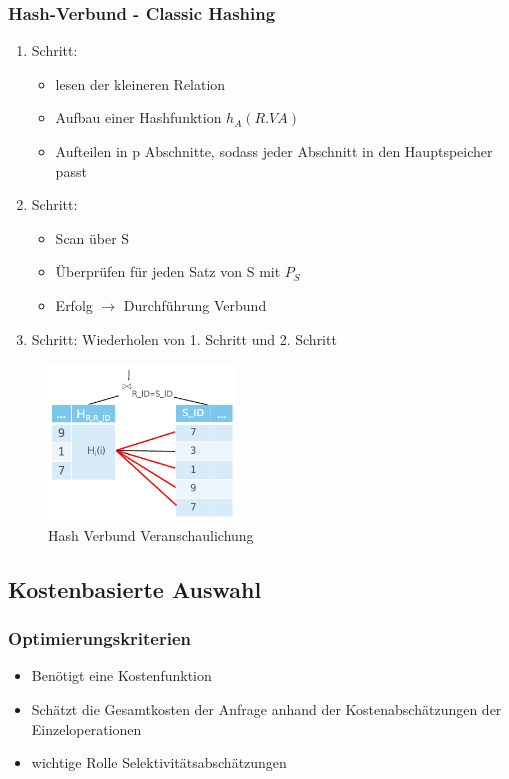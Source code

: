 \documentclass[a4paper]{article}
\begin{document}
    \subsubsection{Hash-Verbund - Classic Hashing}
    \begin{enumerate}
        \item Schritt:
        \begin{itemize}
            \item lesen der kleineren Relation
            \item Aufbau einer Hashfunktion $h_A(R.VA)$
            \item Aufteilen in p Abschnitte, sodass jeder Abschnitt in den Hauptspeicher passt
        \end{itemize}
        
        \item Schritt:
        \begin{itemize}
            \item Scan über S
            \item Überprüfen für jeden Satz von S mit $P_S$
            \item Erfolg $\to$ Durchführung Verbund
        \end{itemize}
        \item Schritt: Wiederholen von 1. Schritt und 2. Schritt
    \end{enumerate}
    \begin{figure}[htp]
        \centering
        \includegraphics[width=5cm]{images/HashVerbund.png}
        \caption{Hash Verbund Veranschaulichung}
        \label{fig:HashVerbund}
    \end{figure}
    
\subsection{Kostenbasierte Auswahl}
    \subsubsection{Optimierungskriterien}
    \begin{itemize}
        \item Benötigt eine Kostenfunktion
        \item Schätzt die Gesamtkosten der Anfrage anhand der Kostenabschätzungen der Einzeloperationen
        \item wichtige Rolle Selektivitätsabschätzungen
    \end{itemize}
    
\end{document}

